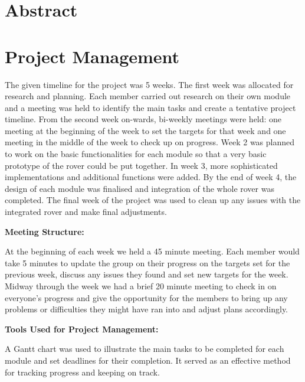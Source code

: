 \documentclass[10pt,twoside]{article}
\begin{document}


\newpage

\tableofcontents

\newpage
\section{Abstract}

\newpage
\section{Project Management}

The given timeline for the project was 5 weeks. The first week was allocated for research and planning. Each member carried out research on their own module and a meeting was held to identify the main tasks and create a tentative project timeline. From the second week on-wards, bi-weekly meetings were held: one meeting at the beginning of the week to set the targets for that week and one meeting in the middle of the week to check up on progress. Week 2 was planned to work on the basic functionalities for each module so that a very basic prototype of the rover could be put together. In week 3, more sophisticated implementations and additional functions were added. By the end of week 4, the design of each module was finalised and integration of the whole rover was completed. The final week of the project was used to clean up any issues with the integrated rover and make final adjustments. 

\textbf{Meeting Structure:}

At the beginning of each week we held a 45 minute meeting. Each member would take 5 minutes to update the group on their progress on the targets set for the previous week, discuss any issues they found and set new targets for the week. Midway through the week we had a brief 20 minute meeting to check in on everyone’s progress and give the opportunity for the members to bring up any problems or difficulties they might have ran into and adjust plans accordingly.

\textbf{Tools Used for Project Management:}

A Gantt chart was used to illustrate the main tasks to be completed for each module and set deadlines for their completion. It served as an effective method for tracking progress and keeping on track.
\end{document}
